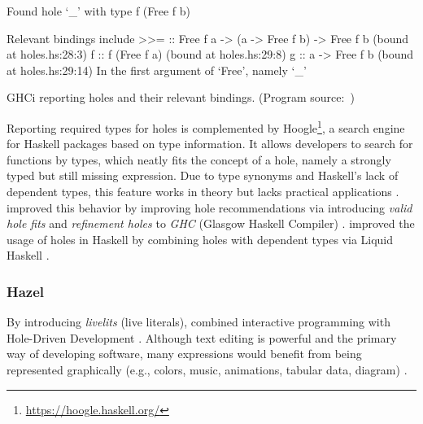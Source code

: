 \begin{program}[ht]
\begin{GenericCode}
Found hole `_' with type f (Free f b)

Relevant bindings include
  >>= :: Free f a -> (a -> Free f b) -> Free f b
    (bound at holes.hs:28:3)
  f :: f (Free f a) (bound at holes.hs:29:8)
  g :: a -> Free f b (bound at holes.hs:29:14)
In the first argument of `Free', namely `_'
\end{GenericCode}
\caption[Caption for LOF]{GHCi reporting holes and their relevant bindings\protect\footnotemark. (Program source:~\cite{gamari_haskell_2019})}
\label{prg:ghc-free-monad-insights}
\end{program}

Reporting required types for holes is complemented by Hoogle\footnote{\url{https://hoogle.haskell.org/}}, a search engine for Haskell packages based on type information.
It allows developers to search for functions by types, which neatly fits the concept of a hole, namely a strongly typed but still missing expression.
Due to type synonyms and Haskell's lack of dependent types, this feature works in theory but lacks practical applications \cite{gissurarson_suggesting_2018}.
\citeauthor{gissurarson_suggesting_2018} improved this behavior by improving hole recommendations via introducing \emph{valid hole fits} and \emph{refinement holes} to \emph{GHC} (Glasgow Haskell Compiler) \cite{gissurarson_suggesting_2018}.
\citeauthor{redmond_toward_2021} improved the usage of holes in Haskell by combining holes with dependent types via Liquid Haskell \cite{redmond_toward_2021}.


\subsubsection{Hazel}
By introducing \emph{livelits} (live literals), \citeauthor{omar_filling_2021} combined interactive programming with Hole-Driven Development \cite{omar_filling_2021}.
Although text editing is powerful and the primary way of developing software, many expressions would benefit from being represented graphically (e.g., colors, music, animations, tabular data, diagram) \cite{omar_filling_2021}.

